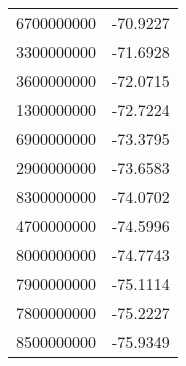 \begin{tabular}{ll}
6700000000 & -70.9227 \\ 
3300000000 & -71.6928 \\ 
3600000000 & -72.0715 \\ 
1300000000 & -72.7224 \\ 
6900000000 & -73.3795 \\ 
2900000000 & -73.6583 \\ 
8300000000 & -74.0702 \\ 
4700000000 & -74.5996 \\ 
8000000000 & -74.7743 \\ 
7900000000 & -75.1114 \\ 
7800000000 & -75.2227 \\ 
8500000000 & -75.9349 \\ 
\hline 
\end{tabular}